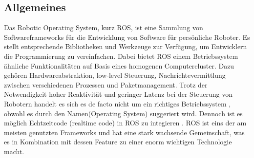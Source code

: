 \subsection{Allgemeines}
Das Robotic Operating System, kurz ROS, ist eine Sammlung von Softwareframeworks für die Entwicklung von Software für persönliche Roboter. Es stellt entsprechende Bibliotheken und Werkzeuge zur Verfügung, um Entwicklern die Programmierung zu vereinfachen. Dabei bietet ROS einem Betriebssystem ähnliche Funktionalitäten auf Basis eines homogenen Computercluster. Dazu gehören Hardwareabstraktion, low-level Steuerung, Nachrichtevermittlung zwischen verschiedenen Prozessen und Paketmanagement. Trotz der Notwendigkeit hoher Reaktivität und geringer Latenz bei der Steuerung von Robotern handelt es sich es de facto nicht um ein richtiges Betriebssystem , obwohl es durch den Namen(\grqq Operating System\grqq) suggeriert wird. Dennoch ist es möglich Echtzeitcode (\grqq realtime code\grqq) in ROS zu integieren \cite{realtimecode}. ROS ist eins der am meisten genutzten Frameworks und hat eine stark wachsende Gemeinschaft, was es in Kombination mit dessen Feature zu einer enorm wichtigen Technologie macht.

